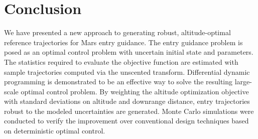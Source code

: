\documentclass[journal ]{new-aiaa}
\begin{document}
\section*{Conclusion}

We have presented a new approach to generating robust, altitude-optimal reference trajectories for Mars entry guidance. The entry guidance problem is posed as an optimal control problem with uncertain initial state and parameters. The statistics required to evaluate the objective function are estimated with sample trajectories computed via the unscented transform. Differential dynamic programming is demonstrated to be an effective way to solve the resulting large-scale optimal control problem. By weighting the altitude optimization objective with standard deviations on altitude and downrange distance, entry trajectories robust to the modeled uncertainties are generated. Monte Carlo simulations were conducted to verify the improvement over conventional design techniques based on deterministic optimal control. 
%

\end{document}
